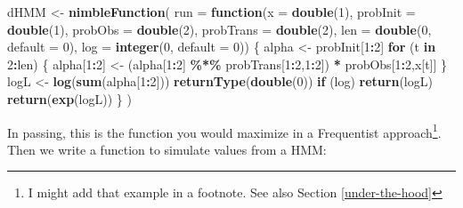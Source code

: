 \documentclass[
  12pt,
]{krantz}
\newenvironment{Shaded}{\begin{snugshade}}{\end{snugshade}}
\newcommand{\AttributeTok}[1]{\textcolor[rgb]{0.13,0.29,0.53}{#1}}
\newcommand{\ControlFlowTok}[1]{\textcolor[rgb]{0.13,0.29,0.53}{\textbf{#1}}}
\newcommand{\DecValTok}[1]{\textcolor[rgb]{0.00,0.00,0.81}{#1}}
\newcommand{\FunctionTok}[1]{\textcolor[rgb]{0.13,0.29,0.53}{\textbf{#1}}}
\newcommand{\NormalTok}[1]{#1}
\newcommand{\OtherTok}[1]{\textcolor[rgb]{0.56,0.35,0.01}{#1}}
\newcommand{\SpecialCharTok}[1]{\textcolor[rgb]{0.81,0.36,0.00}{\textbf{#1}}}
\begin{document}
\begin{Shaded}
\begin{Highlighting}[]
\NormalTok{dHMM }\OtherTok{\textless{}{-}} \FunctionTok{nimbleFunction}\NormalTok{(}
  \AttributeTok{run =} \ControlFlowTok{function}\NormalTok{(}\AttributeTok{x =} \FunctionTok{double}\NormalTok{(}\DecValTok{1}\NormalTok{), }
                 \AttributeTok{probInit =} \FunctionTok{double}\NormalTok{(}\DecValTok{1}\NormalTok{),}
                 \AttributeTok{probObs =} \FunctionTok{double}\NormalTok{(}\DecValTok{2}\NormalTok{),}
                 \AttributeTok{probTrans =} \FunctionTok{double}\NormalTok{(}\DecValTok{2}\NormalTok{),}
                 \AttributeTok{len =} \FunctionTok{double}\NormalTok{(}\DecValTok{0}\NormalTok{, }\AttributeTok{default =} \DecValTok{0}\NormalTok{),}
                 \AttributeTok{log =} \FunctionTok{integer}\NormalTok{(}\DecValTok{0}\NormalTok{, }\AttributeTok{default =} \DecValTok{0}\NormalTok{)) \{}
\NormalTok{    alpha }\OtherTok{\textless{}{-}}\NormalTok{ probInit[}\DecValTok{1}\SpecialCharTok{:}\DecValTok{2}\NormalTok{]}
    \ControlFlowTok{for}\NormalTok{ (t }\ControlFlowTok{in} \DecValTok{2}\SpecialCharTok{:}\NormalTok{len) \{}
\NormalTok{      alpha[}\DecValTok{1}\SpecialCharTok{:}\DecValTok{2}\NormalTok{] }\OtherTok{\textless{}{-}}\NormalTok{ (alpha[}\DecValTok{1}\SpecialCharTok{:}\DecValTok{2}\NormalTok{] }\SpecialCharTok{\%*\%}\NormalTok{ probTrans[}\DecValTok{1}\SpecialCharTok{:}\DecValTok{2}\NormalTok{,}\DecValTok{1}\SpecialCharTok{:}\DecValTok{2}\NormalTok{]) }\SpecialCharTok{*}\NormalTok{ probObs[}\DecValTok{1}\SpecialCharTok{:}\DecValTok{2}\NormalTok{,x[t]]}
\NormalTok{    \}}
\NormalTok{    logL }\OtherTok{\textless{}{-}} \FunctionTok{log}\NormalTok{(}\FunctionTok{sum}\NormalTok{(alpha[}\DecValTok{1}\SpecialCharTok{:}\DecValTok{2}\NormalTok{]))}
    \FunctionTok{returnType}\NormalTok{(}\FunctionTok{double}\NormalTok{(}\DecValTok{0}\NormalTok{))}
    \ControlFlowTok{if}\NormalTok{ (log) }\FunctionTok{return}\NormalTok{(logL)}
    \FunctionTok{return}\NormalTok{(}\FunctionTok{exp}\NormalTok{(logL))}
\NormalTok{  \}}
\NormalTok{)}
\end{Highlighting}
\end{Shaded}

In passing, this is the function you would maximize in a Frequentist approach\footnote{I might add that example in a footnote. See also Section \ref{under-the-hood}}. Then we write a function to simulate values from a HMM:
\end{document}

